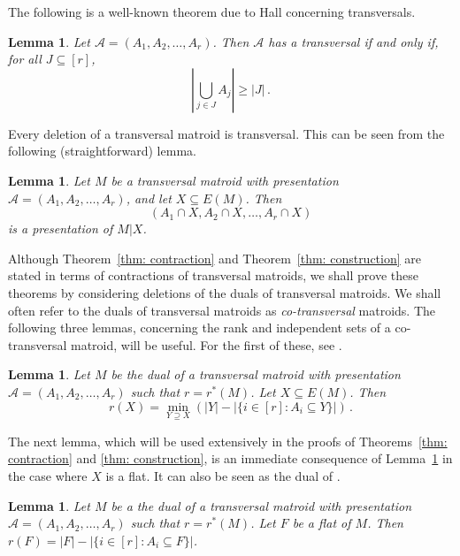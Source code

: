 \documentclass[11pt, reqno]{amsart}
\newtheorem{lemma}[theorem]{Lemma}
\begin{document}
The following is a well-known theorem due to Hall \cite{hal35} concerning transversals.

\begin{lemma} \label{lem: Hall}
Let $\mathcal A = (A_1, A_2, \ldots, A_r)$. Then $\mathcal A$ has a transversal if and only if, for all $J \subseteq [r]$,
$$
\left|\bigcup_{j \in J} A_j\right| \geq |J| \,.
$$
\end{lemma}

Every deletion of a transversal matroid is transversal. This can be seen from the following (straightforward) lemma.

\begin{lemma} \label{lem: deletion presentation}
Let $M$ be a transversal matroid with presentation $\mathcal A = (A_1, A_2, \ldots, A_r)$, and let $X \subseteq E(M)$. Then 
$$
(A_1 \cap X, A_2 \cap X, \ldots, A_r \cap X)
$$
is a presentation of $M | X$.
\end{lemma}

Although Theorem~\ref{thm: contraction} and Theorem~\ref{thm: construction} are stated in terms of contractions of transversal matroids, we shall prove these theorems by considering deletions of the duals of transversal matroids. We shall often refer to the duals of transversal matroids as \emph{co-transversal} matroids. The following three lemmas, concerning the rank and independent sets of a co-transversal matroid, will be useful. For the first of these, see \cite[Lemma 4.1]{ing73}.

\begin{lemma} \label{lem: rank_general}
Let $M$ be the dual of a transversal matroid with presentation $\mathcal A = (A_1, A_2, \ldots, A_r)$ such that $r = r^*(M)$. Let $X \subseteq E(M)$. Then 
$$
r(X) = \min_{Y \supseteq X}\left(|Y| - \left|\{i \in [r] : A_i \subseteq Y\}\right|\right) \,.
$$
\end{lemma}

The next lemma, which will be used extensively in the proofs of Theorems~\ref{thm: contraction} and \ref{thm: construction}, is an immediate consequence of Lemma~\ref{lem: rank_general} in the case where $X$ is a flat. It can also be seen as the dual of \cite[Corollary 2.5]{bon15}.

\begin{lemma} \label{lem: rank}
Let $M$ be a the dual of a transversal matroid with presentation $\mathcal A = (A_1, A_2, \ldots, A_r)$ such that $r = r^*(M)$. Let $F$ be a flat of $M$. Then $r(F) = |F| - \left|\{i \in [r] : A_i \subseteq F\}\right|$. 
\end{lemma}
	
\end{document}
